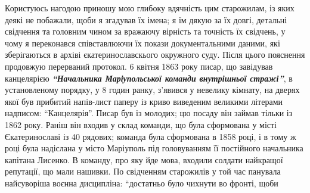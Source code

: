 \documentclass[a4paper,20pt]{report}
\begin{document}
Користуюсь нагодою приношу мою глибоку вдячність цим старожилам, із яких
деякі не побажали, щоби я згадував їх імена; я їм дякую за їх довгі, детальні свідчення та головним чином
за вражаючу вірність та точність їх свідчень, у чому я переконався співставлюючи їх покази
документальними даними, які зберігаються в архіві єкатеринославскього окружного суду. Після цього пояснення
продовжую перерваний протокол.
6 квітня 1863 року писар, що завідував канцелярією 
\textbf{\em ``Начальника Маріупольської команди внутрішньої стражі''}, в
установленому порядку, у 8 годин ранку, з'явився у невелику кімнату, на дверях
якої був прибитий напів-лист паперу із криво виведеним великими літерами
надписом: ``Канцелярія''. Писар був із молодих; цю посаду він займав тільки із
1862 року. Раніш він входив у склад команди, що була сформована у місті
Єкатеринославі із 40 рядових; команда була сформована в 1858 році, і в тому ж
році була надіслана у місто Маріуполь під головуванням її постійного начальника
капітана Лисенко. В команду, про яку йде мова, входили солдати найкращої
репутації, що мали нашивки. По свідченням старожилів у той час панувала
найсуворіша воєнна дисципліна: ``достатньо було чихнути во фронті, щоби
\end{document}
